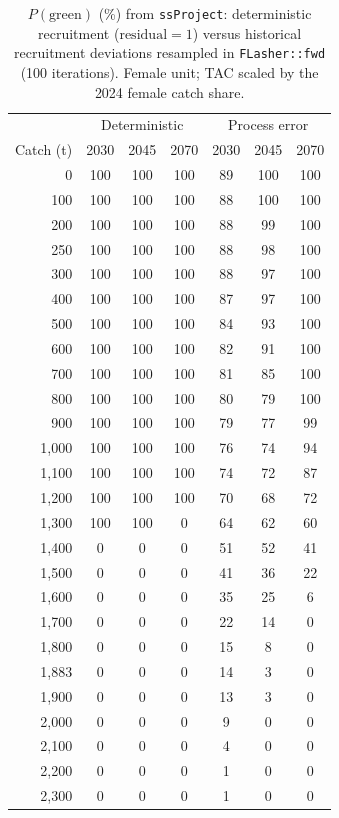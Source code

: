\begin{table}[H]
\centering
\caption{$P(\mathrm{green})$ (\%) from \texttt{ssProject}: deterministic
  recruitment ($\mathrm{residual}=1$) versus historical recruitment
  deviations resampled in \texttt{FLasher::fwd} (100 iterations).
  Female unit; TAC scaled by the 2024 female catch share.}
\label{tab:ssproject}
\begin{tabular}{rccc|ccc}
\toprule
 & \multicolumn{3}{c|}{Deterministic} & \multicolumn{3}{c}{Process error} \\
Catch (t) & 2030 & 2045 & 2070 & 2030 & 2045 & 2070 \\
\midrule
0 & 100 & 100 & 100 & 89 & 100 & 100 \\
100 & 100 & 100 & 100 & 88 & 100 & 100 \\
200 & 100 & 100 & 100 & 88 & 99 & 100 \\
250 & 100 & 100 & 100 & 88 & 98 & 100 \\
300 & 100 & 100 & 100 & 88 & 97 & 100 \\
400 & 100 & 100 & 100 & 87 & 97 & 100 \\
500 & 100 & 100 & 100 & 84 & 93 & 100 \\
600 & 100 & 100 & 100 & 82 & 91 & 100 \\
700 & 100 & 100 & 100 & 81 & 85 & 100 \\
800 & 100 & 100 & 100 & 80 & 79 & 100 \\
900 & 100 & 100 & 100 & 79 & 77 & 99 \\
1,000 & 100 & 100 & 100 & 76 & 74 & 94 \\
1,100 & 100 & 100 & 100 & 74 & 72 & 87 \\
1,200 & 100 & 100 & 100 & 70 & 68 & 72 \\
1,300 & 100 & 100 & 0 & 64 & 62 & 60 \\
1,400 & 0 & 0 & 0 & 51 & 52 & 41 \\
1,500 & 0 & 0 & 0 & 41 & 36 & 22 \\
1,600 & 0 & 0 & 0 & 35 & 25 & 6 \\
1,700 & 0 & 0 & 0 & 22 & 14 & 0 \\
1,800 & 0 & 0 & 0 & 15 & 8 & 0 \\
1,883 & 0 & 0 & 0 & 14 & 3 & 0 \\
1,900 & 0 & 0 & 0 & 13 & 3 & 0 \\
2,000 & 0 & 0 & 0 & 9 & 0 & 0 \\
2,100 & 0 & 0 & 0 & 4 & 0 & 0 \\
2,200 & 0 & 0 & 0 & 1 & 0 & 0 \\
2,300 & 0 & 0 & 0 & 1 & 0 & 0 \\
\bottomrule
\end{tabular}
\end{table}
